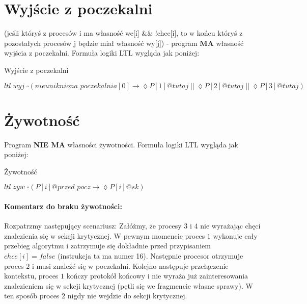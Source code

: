\documentclass[oneside]{book}
\begin{document}

\section{Wyjście z poczekalni} (jeśli któryś z procesów i ma własność we[i] \&\& !chce[i], to w końcu któryś z pozostałych procesów j będzie miał własność wy[j]) - program \textbf{MA} własność wyjścia z poczekalni. Formuła logiki LTL wygląda jak poniżej:



 \begin{algorithm}[H]                                                            
   \caption{Wyjście z poczekalni}\label{euclid}
   \begin{algorithmic}[1]                                                         
     \State $ltl \;wyj\; { \square (nieunikniona\_poczekalnia[0] \rightarrow \lozenge P[1]@tutaj\; || \;\lozenge P[2]@tutaj \;|| \; \lozenge P[3]@tutaj)    } $ 
  \end{algorithmic}                                                             
\end{algorithm} 






\section{Żywotność}
Program \textbf{NIE MA} własności żywotności. Formuła logiki LTL wygląda jak poniżej:
\begin{algorithm}[H]                                                            
   \caption{Żywotność}\label{euclid}
   \begin{algorithmic}[1]                                                         
     \State $ltl \; zyw \; { \square (P[i]@przed\_pocz \rightarrow \lozenge P[i]@sk) }  $ 
  \end{algorithmic}                                                             
\end{algorithm} 


\paragraph{Komentarz do braku żywotności:}
Rozpatrzmy następujący scenariusz: Załóżmy, że procesy $3$ i $4$ nie wyrażając chęci znalezienia się w sekcji krytycznej. W pewnym momencie proces $1$ wykonuje cały przebieg algorytmu i zatrzymuje się dokładnie przed przypisaniem $chce[i]=false$ (instrukcja ta ma numer 16). Następnie procesor otrzymuje proces $2$ i musi znaleźć się w poczekalni. Kolejno następuje przełączenie kontekstu, proces $1$ kończy protokół końcowy i nie wyraża już zainteresowania znalezieniem się w sekcji krytycznej (pętli się we fragmencie własne sprawy). W ten sposób proces $2$ nigdy nie wejdzie do sekcji krytycznej.
\end{document}
